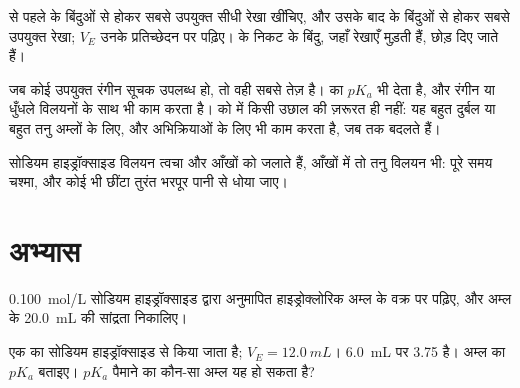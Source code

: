 \begin{method}[चालकतामितीय अनुमापन से तुल्यता]\label{met:g12:ph-conductivity-titrations:two-lines}
 से पहले के बिंदुओं से होकर सबसे उपयुक्त सीधी रेखा खींचिए, और
उसके बाद के बिंदुओं से होकर सबसे उपयुक्त रेखा; $V_E$ उनके
प्रतिच्छेदन पर पढ़िए।  के निकट के बिंदु, जहाँ रेखाएँ मुड़ती हैं, छोड़ दिए
जाते हैं।
\end{method}

\begin{remark}[कौन-सी विधि कब]\label{rem:g12:ph-conductivity-titrations:which}
जब कोई उपयुक्त रंगीन सूचक उपलब्ध हो, तो वही सबसे तेज़ है।   का $pK_a$ भी देता है, और रंगीन
या धुँधले विलयनों के साथ भी काम करता है।  को  में किसी उछाल की
ज़रूरत ही नहीं: यह बहुत दुर्बल या बहुत तनु अम्लों के लिए, और 
अभिक्रियाओं के लिए भी काम करता है, जब तक  बदलते हैं।
\end{remark}

\begin{safety}{}
सोडियम हाइड्रॉक्साइड विलयन त्वचा और आँखों को जलाते हैं, आँखों में तो तनु विलयन
भी: पूरे समय चश्मा, और कोई भी छींटा तुरंत
भरपूर पानी से धोया जाए।
\end{safety}

\section{अभ्यास}


\begin{exercise}[$\star$]\label{exo:g12:ph-conductivity-titrations:1}
\qty{0.100}{mol/L} सोडियम हाइड्रॉक्साइड द्वारा अनुमापित हाइड्रोक्लोरिक अम्ल के
वक्र पर  पढ़िए, और अम्ल के
\qty{20.0}{mL} की सांद्रता निकालिए।
\end{exercise}

\begin{exercise}[$\star$]\label{exo:g12:ph-conductivity-titrations:2}
एक  का सोडियम हाइड्रॉक्साइड से  किया जाता है; $V_E = \qty{12.0}{mL}$।
\qty{6.0}{mL} पर  3.75 है। अम्ल का $pK_a$ बताइए। $pK_a$ पैमाने का
कौन-सा अम्ल यह हो सकता है?
\end{exercise}

